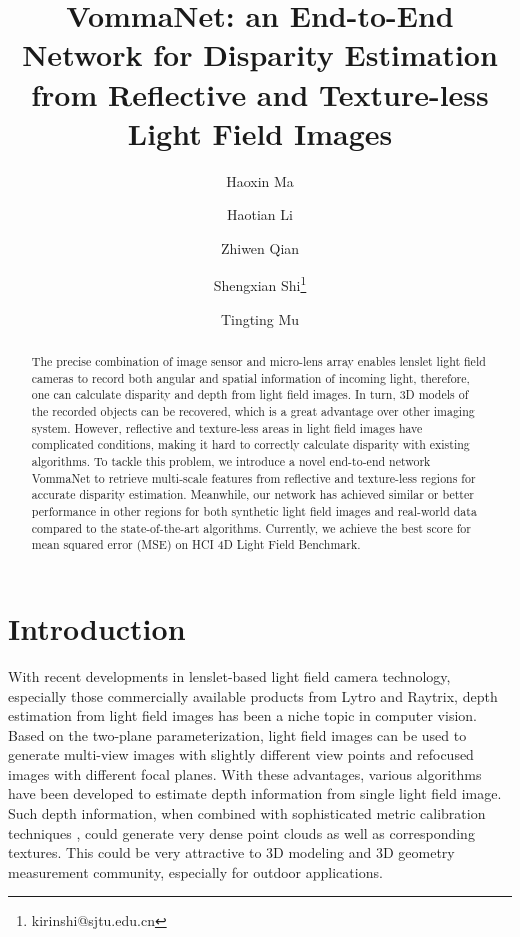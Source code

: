 \documentclass[10pt,twocolumn,letterpaper]{article}
\begin{document}
	
	\title{VommaNet: an End-to-End Network for Disparity Estimation from Reflective and Texture-less Light Field Images}
	
	\author[1,3]{Haoxin Ma}
\author[2]{Haotian Li}
\author[2]{Zhiwen Qian}
\author[1]{Shengxian Shi\thanks{kirinshi@sjtu.edu.cn}}
\author[3]{Tingting Mu}


	
	\maketitle
	
	\begin{abstract}
		The precise combination of image sensor and micro-lens array enables lenslet light field cameras to record both angular and spatial information of incoming light, therefore, one can calculate disparity and depth from light field images. In turn, 3D models of the recorded objects can be recovered, which is a great advantage over other imaging system. However, reflective and texture-less areas in light field images have complicated conditions, making it hard to correctly calculate disparity with existing algorithms. To tackle this problem, we introduce a novel end-to-end network VommaNet to retrieve multi-scale features from reflective and texture-less regions for accurate disparity estimation.  Meanwhile, our network has achieved similar or better performance in other regions for both synthetic light field images and real-world data compared to the state-of-the-art algorithms. Currently, we achieve the best score for mean squared error (MSE) on HCI 4D Light Field Benchmark.
	\end{abstract}
	
	\section{Introduction}
	
	With recent developments in lenslet-based light field camera technology\cite{ng2005light}, especially those commercially available products from Lytro\cite{lytro} and Raytrix\cite{raytrix}, depth estimation from light field images has been a niche topic in computer vision. Based on the two-plane parameterization\cite{levoy2006light}, light field images can be used to generate multi-view images with slightly different view points and refocused images with different focal planes\cite{ng2006}. With these advantages, various algorithms\cite{jeon2015accurate, jeon2018depth, zhang2016robust} have been developed to estimate depth information from single light field image. Such depth information, when combined with sophisticated metric calibration techniques \cite{heinze2016automated, bok2017geometric}, could generate very dense point clouds as well as corresponding textures. This could be very attractive to 3D modeling and 3D geometry measurement community, especially for outdoor applications. 
	
\end{document}

